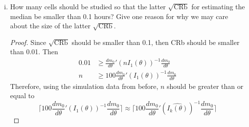 \documentclass[letterpaper, 12pt]{article}
\begin{document}
\begin{enumerate}[(i)]
\begin{proof}
The median is the value of $t$ such that 
\[
F(t|c,d) = 1 - \exp(-dt^c) = 0.5
\]
Hence,
\begin{align*}
1 - \exp(-dt^c) &= 0.5 \\
0.5 &= \exp(-dt^c) \\
\log 0.5 &= -dt^c \\
\log 2 &= dt^c \\
\left(\frac{\log 2}{d}\right)^{1/c} &= t
\end{align*}
Therefore, the median $m_0$ is
\[
m_0(c,d) = \left(\frac{\log 2}{d}\right)^{1/c}
\]
which is a function only of the parameters of the distribution. Let $\theta = (c,d)'$. Then 
\begin{align*}
\frac{d m_0}{d \theta} = \begin{bmatrix}
-
\left(
\frac{1}{c^2}
\right)
\log
\left(
\frac{\log 2}{d}
\right)
\left(
\frac{\log 2}{d}
\right)^{1/c}
&
-
\left(
\frac{1}{c}
\right)
(\log 2)^{1/c}
\left(
\frac{1}{d}
\right)^{1/c + 1}
\end{bmatrix}'
\end{align*}
Because the data are i.i.d., the CRb then is 
\[
\frac{dm_0}{d\theta}' (nI_1(\theta))^{-1} \frac{dm_0}{d\theta}
\]
which we approximate by
\[
\frac{dm_0}{d\theta}' (n\widehat{I_k(\theta)})^{-1} \frac{dm_0}{d\theta}
\]
\end{proof}
\item
How many cells should be studied so that the latter 
$\sqrt{\text{CRb}}$ for estimating the median be smaller than 0.1
hours? Give one reason for why we may care about the size of the latter $\sqrt{\text{CRb}}$.
\begin{proof}
Since $\sqrt{\text{CRb}}$ should be smaller than 0.1, then 
CRb should be smaller than 0.01. Then
\begin{align*}
0.01 
&\geq
\frac{dm_0}{d\theta}' (nI_1(\theta))^{-1} \frac{dm_0}{d\theta} \\
n 
&\geq
100\frac{dm_0}{d\theta}' (I_1(\theta))^{-1} \frac{dm_0}{d\theta}
\end{align*}
Therefore, using the simulation data from before, $n$ should be greater than or equal to
\[
\lceil 
100\frac{dm_0}{d\theta}' (I_1(\theta))^{-1} \frac{dm_0}{d\theta}
\rceil
\approx
\lceil
100\frac{dm_0}{d\theta}' (\widehat{I_k(\theta)})^{-1} \frac{dm_0}{d\theta}
\rceil
\]
\end{proof}
\end{enumerate}
\end{document}
